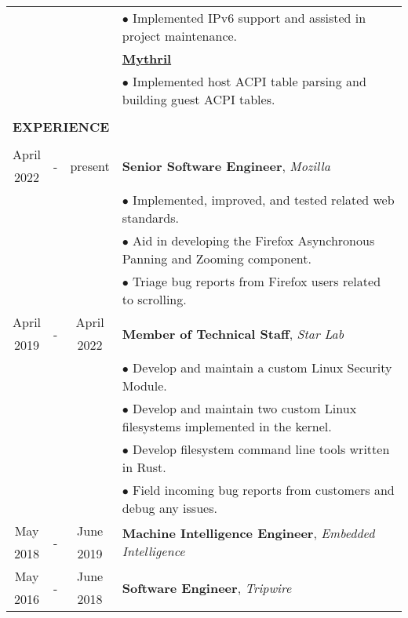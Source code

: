 \documentclass[10pt]{article}
\begin{document}
\begin{table}[ht]
\begin{tabular}{@{\hspace{0mm}}c@{\hspace{1mm}}c@{\hspace{3mm}}cl}
            & & & $\bullet$ Implemented IPv6 support and assisted in project maintenance.\\[2mm]
            & & & \textbf{\href{https://github.com/mythril-hypervisor/mythril}{Mythril}}\\
            & & & $\bullet$ Implemented host ACPI table parsing and building guest ACPI tables.\\[2mm]
            \hline\\[-3mm]
            \multicolumn{4}{l}{\large{\textbf{EXPERIENCE}}}\\
            \hline\\[-2mm]
            April & \multirow{2}{*}{-} & \multirow{2}{*}{present} & \multirow{2}{*}{\textbf{Senior Software Engineer}, \textit{Mozilla}}\\
            2022 & & &\\
            & & & $\bullet$ Implemented, improved, and tested related web standards.\\
            & & & $\bullet$ Aid in developing the Firefox Asynchronous Panning and Zooming component.\\
            & & & $\bullet$ Triage bug reports from Firefox users related to scrolling.\\
            April & \multirow{2}{*}{-} & April & \multirow{2}{*}{\textbf{Member of Technical Staff}, \textit{Star Lab}}\\
            2019 & & 2022 &\\
            & & & $\bullet$ Develop and maintain a custom Linux Security Module.\\
            & & & $\bullet$ Develop and maintain two custom Linux filesystems implemented in the kernel.\\
            & & & $\bullet$ Develop filesystem command line tools written in Rust.\\
            & & & $\bullet$ Field incoming bug reports from customers and debug any issues.\\
            May & \multirow{2}{*}{-} & June & \multirow{2}{*}{\textbf{Machine Intelligence Engineer}, \textit{Embedded Intelligence}}\\
            2018 & & 2019 &\\
            May & \multirow{2}{*}{-} & June & \multirow{2}{*}{\textbf{Software Engineer}, \textit{Tripwire}}\\
            2016 & & 2018 &\\

\end{tabular}
\end{table}
\end{document}
